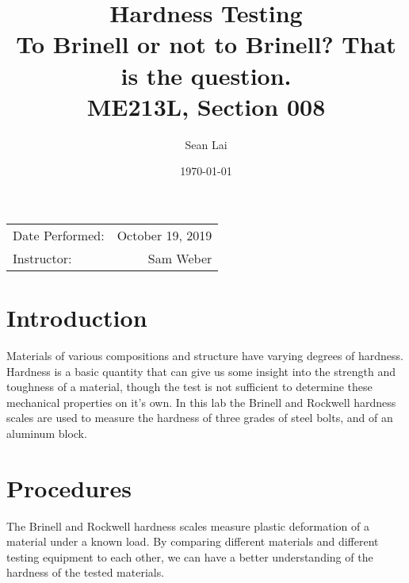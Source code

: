 \documentclass{article}
\title{Hardness Testing \\ To Brinell or not to Brinell? That is the question. \\ ME213L, Section 008}
\author{Sean Lai} %
\date{\today} %
\begin{document}
\maketitle %

\begin{center}
\begin{tabular}{l r}
Date Performed: & October 19, 2019 \\ %

Instructor: & Sam Weber %
\end{tabular}
\end{center}



\section{Introduction}

Materials of various compositions and structure have varying degrees of hardness. Hardness is a basic quantity that can give us some insight into the strength and toughness of a material, though the test is not sufficient to determine these mechanical properties on it's own. In this lab the Brinell and Rockwell hardness scales are used to measure the hardness of three grades of steel bolts, and of an aluminum block.



\section{Procedures}

The Brinell and Rockwell hardness scales measure plastic deformation of a material under a known load. By comparing different materials and different testing equipment to each other, we can have a better understanding of the hardness of the tested materials.
\end{document}
